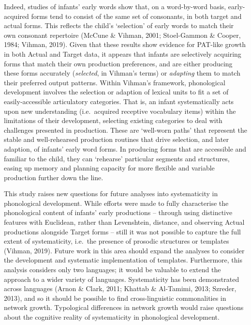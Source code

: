 \documentclass[
  man]{apa6}
\begin{document}
Indeed, studies of infants' early words show that, on a word-by-word basis, early-acquired forms tend to consist of the same set of consonants, in both target and actual forms. This reflects the child's `selection' of early words to match their own consonant repertoire (McCune \& Vihman, 2001; Stoel-Gammon \& Cooper, 1984; Vihman, 2019). Given that these results show evidence for PAT-like growth in both Actual and Target data, it appears that infants are selectively acquiring forms that match their own production preferences, and are either producing these forms accurately (\emph{selected}, in Vihman's terms) or \emph{adapting} them to match their preferred output patterns. Within Vihman's framework, phonological development involves the selection or adaption of lexical units to fit a set of easily-accessible articulatory categories. That is, an infant systematically acts upon new understanding (i.e.~acquired receptive vocabulary items) within the limitations of their development, selecting existing categories to deal with challenges presented in production. These are `well-worn paths' that represent the stable and well-rehearsed production routines that drive selection, and later adaption, of infants' early word forms. In producing forms that are accessible and familiar to the child, they can `rehearse' particular segments and structures, easing up memory and planning capacity for more flexible and variable production further down the line.

This study raises new questions for future analyses into systematicity in phonological development. While efforts were made to fully characterise the phonological content of infants' early productions -- through using distinctive features with Euclidean, rather than Levenshtein, distance, and observing Actual productions alongside Target forms -- still it was not possible to capture the full extent of systematicity, i.e.~the presence of prosodic structures or templates (Vihman, 2019). Future work in this area should expand the analyses to consider the development and systematic implementation of templates. Furthermore, this analysis considers only two languages; it would be valuable to extend the approach to a wider variety of languages. Systematicity has been demonstrated across languages (Arnon \& Clark, 2011; Khattab \& Al-Tamimi, 2013; Szreder, 2013), and so it should be possible to find cross-linguistic commonalities in network growth. Typological differences in network growth would raise questions about the cognitive reality of systematicity in phonological development.
\end{document}

